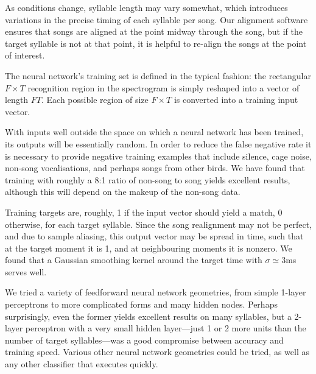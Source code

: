 \documentclass{article}
\let\oldmarginpar\marginpar
\renewcommand\marginpar[1]{\-\oldmarginpar[\raggedleft\footnotesize #1]
  {\raggedright\footnotesize #1}}
\begin{document}
As conditions change, syllable length may vary somewhat, which
introduces variations in the precise timing of each syllable per
song. Our alignment software ensures that songs are aligned at the
point midway through the song, but if the target syllable is not at
that point, it is helpful to re-align the songs at the point of
interest.\marginpar{Quick overview of how?}

The neural network's training set is defined in the typical fashion:
the rectangular $F\times T$ recognition region in the spectrogram is
simply reshaped into a vector of length $FT$. Each possible region of
size $F\times T$ is converted into a training input vector.

With inputs well outside the space on which a neural network has been
trained, its outputs will be essentially random. In order to reduce
the false negative rate it is necessary to provide negative training
examples that include silence, cage noise, non-song vocalisations, and
perhaps songs from other birds. We have found that training with
roughly a 8:1 ratio of non-song to song yields excellent results,
although this will depend on the makeup of the non-song data.

Training targets are, roughly, 1 if the input vector should yield a
match, 0 otherwise, for each target syllable. Since the song
realignment may not be perfect, and due to sample aliasing, this
output vector may be spread in time, such that at the target moment it
is 1, and at neighbouring moments it is nonzero. We found that a
Gaussian smoothing kernel around the target time with $\sigma\simeq
3$ms serves well.

We tried a variety of feedforward neural network geometries, from
simple 1-layer perceptrons to more complicated forms and many hidden
nodes. Perhaps surprisingly, even the former yields excellent results
on many syllables, but a 2-layer perceptron with a very small hidden
layer---just 1 or 2 more units than the number of target
syllables---was a good compromise between accuracy and training
speed. Various other neural network geometries could be tried, as well
as any other classifier that executes quickly.
\end{document}
